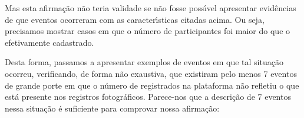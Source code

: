 \documentclass[
12pt,		%
openright,	%
twoside,  %
a4paper,			%
chapter=TITLE,		%
english,			%
french,				%
spanish,			%
brazil				%
]{USPSC-classe/USPSC}
\begin{document}
Mas esta afirma\c{c}\~ao n\~ao teria validade se n\~ao fosse poss\'{\i}vel apresentar evid\^encias de que eventos ocorreram com as caracter\'{\i}sticas citadas acima. Ou seja, precisamos mostrar casos em que o n\'umero de participantes foi maior do que o efetivamente cadastrado.










Desta forma, passamos a apresentar exemplos de eventos em que tal situa\c{c}\~ao ocorreu, verificando, de forma n\~ao exaustiva, que existiram pelo menos 7 eventos de grande porte em que o n\'umero de registrados na plataforma n\~ao refletiu o que est\'a presente nos registros fotogr\'aficos. Parece-nos que a descri\c{c}\~ao de 7 eventos nessa situa\c{c}\~ao \'e suficiente para comprovar nossa afirma\c{c}\~ao:
\end{document}
